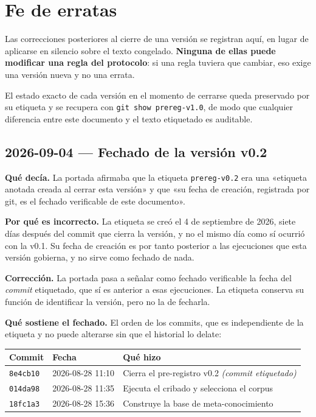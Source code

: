 \documentclass[11pt,letterpaper]{article}
\newcommand{\preregtag}{prereg-v1.0}
\begin{document}
\section{Fe de erratas}
\label{sec:erratas}

Las correcciones posteriores al cierre de una versión se registran aquí, en lugar
de aplicarse en silencio sobre el texto congelado. \textbf{Ninguna de ellas puede
modificar una regla del protocolo}: si una regla tuviera que cambiar, eso exige una
versión nueva y no una errata.

El estado exacto de cada versión en el momento de cerrarse queda preservado por su
etiqueta y se recupera con \texttt{git show \preregtag}, de modo que cualquier
diferencia entre este documento y el texto etiquetado es auditable.

\subsection*{2026-09-04 --- Fechado de la versión v0.2}

\textbf{Qué decía.} La portada afirmaba que la etiqueta \texttt{prereg-v0.2} era
una «etiqueta anotada creada al cerrar esta versión» y que «su fecha de creación,
registrada por git, es el fechado verificable de este documento».

\textbf{Por qué es incorrecto.} La etiqueta se creó el 4 de septiembre de 2026,
siete días después del commit que cierra la versión, y no el mismo día como sí
ocurrió con la v0.1. Su fecha de creación es por tanto posterior a las ejecuciones
que esta versión gobierna, y no sirve como fechado de nada.

\textbf{Corrección.} La portada pasa a señalar como fechado verificable la fecha
del \emph{commit} etiquetado, que sí es anterior a esas ejecuciones. La etiqueta
conserva su función de identificar la versión, pero no la de fecharla.

\textbf{Qué sostiene el fechado.} El orden de los commits, que es independiente de
la etiqueta y no puede alterarse sin que el historial lo delate:

\begin{center}
\begin{tabularx}{0.92\textwidth}{L{2.2cm} L{3.4cm} Y}
\toprule
{} \textbf{Commit} & \textbf{Fecha} & \textbf{Qué hizo} \\
\midrule
\texttt{8e4cb10} & 2026-08-28 11:10 & Cierra el pre-registro v0.2 \textit{(commit etiquetado)} \\
\texttt{014da98} & 2026-08-28 11:35 & Ejecuta el cribado y selecciona el corpus \\
\texttt{18fc1a3} & 2026-08-28 15:36 & Construye la base de meta-conocimiento \\
\bottomrule
\end{tabularx}
\end{center}
\end{document}
